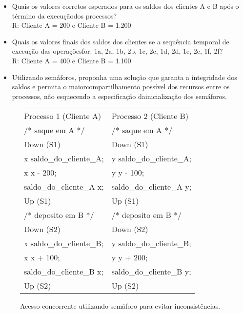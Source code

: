 \begin{itemize}
\item Quais os valores corretos esperados para os saldos dos clientes
  A e B após o término da execuçãodos processos?\\

R: Cliente A = 200 e Cliente B = 1.200

\item Quais os valores finais dos saldos dos clientes se a sequência
  temporal de execução das operaçõesfor: 1a, 2a, 1b, 2b, 1c, 2c, 1d,
  2d, 1e, 2e, 1f, 2f?\\

R: Cliente A = 400 e Cliente B = 1.100

\item Utilizando semáforos, proponha uma solução que garanta a
  integridade dos saldos e permita o maiorcompartilhamento possível
  dos recursos entre os processos, não esquecendo a especificação
  dainicialização dos semáforos.
\end{itemize}

\begin{figure}
\centering
\begin{tt}
\begin{tabular}{l|l}
Processo 1 (Cliente A) & Processo 2 (Cliente B)\\
/* saque em A */ & /* saque em A */\\
Down (S1) & Down (S1)\\
x \ra{} saldo\_do\_cliente\_A; & y \ra{} saldo\_do\_cliente\_A;\\
x \ra{} x - 200; & y \ra{} y - 100; \\ 
saldo\_do\_cliente\_A \ra{} x; &  saldo\_do\_cliente\_A \ra{} y;\\
Up (S1) & Up (S1)\\
/* deposito em B */ & /* deposito em B */\\
Down (S2) & Down (S2)\\
x \ra{} saldo\_do\_cliente\_B; & y \ra{} saldo\_do\_cliente\_B;\\
x \ra{} x + 100; & y \ra{} y + 200;\\
saldo\_do\_cliente\_B \ra{} x; & saldo\_do\_cliente\_B \ra{} y;\\
Up (S2) & Up (S2) \\ 
\end{tabular}
\end{tt}

\caption{Acesso concorrente utilizando semáforo para evitar inconsistências.}
\end{figure}


